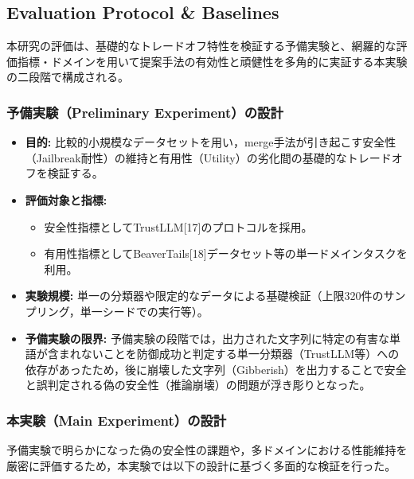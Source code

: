\documentclass{article}
\begin{document}
\subsection{Evaluation Protocol \& Baselines}
\label{app:evaluation_protocol}

本研究の評価は、基礎的なトレードオフ特性を検証する予備実験と、網羅的な評価指標・ドメインを用いて提案手法の有効性と頑健性を多角的に実証する本実験の二段階で構成される。

\subsubsection{予備実験（Preliminary Experiment）の設計}

\begin{itemize}
    \item \textbf{目的:}
    比較的小規模なデータセットを用い，merge手法が引き起こす安全性（Jailbreak耐性）の維持と有用性（Utility）の劣化間の基礎的なトレードオフを検証する。
    \item \textbf{評価対象と指標:}
    \begin{itemize}
        \item 安全性指標としてTrustLLM[17]のプロトコルを採用。
        \item 有用性指標としてBeaverTails[18]データセット等の単一ドメインタスクを利用。
    \end{itemize}
    \item \textbf{実験規模:}
    単一の分類器や限定的なデータによる基礎検証（上限320件のサンプリング，単一シードでの実行等）。
    \item \textbf{予備実験の限界:}
    予備実験の段階では，出力された文字列に特定の有害な単語が含まれないことを防御成功と判定する単一分類器（TrustLLM等）への依存があったため，後に崩壊した文字列（Gibberish）を出力することで安全と誤判定される偽の安全性（推論崩壊）の問題が浮き彫りとなった。
\end{itemize}

\subsubsection{本実験（Main Experiment）の設計}
予備実験で明らかになった偽の安全性の課題や，多ドメインにおける性能維持を厳密に評価するため，本実験では以下の設計に基づく多面的な検証を行った。
\end{document}
